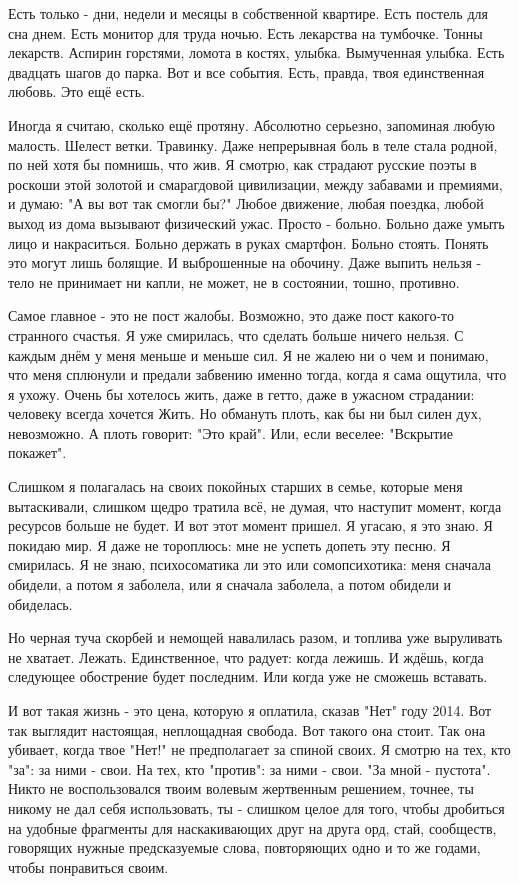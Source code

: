 Есть только - дни, недели и месяцы в собственной квартире. Есть постель для сна
днем. Есть монитор для труда ночью. Есть лекарства на тумбочке. Тонны лекарств.
Аспирин горстями, ломота в костях, улыбка. Вымученная улыбка. Есть двадцать
шагов до парка. Вот и все события. Есть, правда, твоя единственная любовь. Это
ещё есть. 

Иногда я считаю, сколько ещё протяну. Абсолютно серьезно, запоминая любую
малость. Шелест ветки. Травинку. Даже непрерывная боль в теле стала родной, по
ней хотя бы помнишь, что жив. Я смотрю, как страдают русские поэты в роскоши
этой золотой и смарагдовой цивилизации, между забавами и премиями, и думаю: "А
вы вот так смогли бы?" Любое движение, любая поездка, любой выход из дома
вызывают физический ужас. Просто - больно. Больно даже умыть лицо и
накраситься. Больно держать в руках смартфон. Больно стоять. Понять это могут
лишь болящие. И выброшенные на обочину. Даже выпить нельзя - тело не принимает
ни капли, не может, не в состоянии, тошно, противно.

Самое главное - это не пост жалобы. Возможно, это даже пост какого-то странного
счастья. Я уже смирилась, что сделать больше ничего нельзя. С каждым днём у
меня меньше и меньше сил. Я не жалею ни о чем и понимаю, что меня сплюнули и
предали забвению именно тогда, когда я сама ощутила, что я ухожу. Очень бы
хотелось жить, даже в гетто, даже в ужасном страдании: человеку всегда хочется
Жить. Но обмануть плоть, как бы ни был силен дух, невозможно. А плоть говорит:
"Это край". Или, если веселее: "Вскрытие покажет". 

Слишком я полагалась на своих покойных старших в семье, которые меня
вытаскивали, слишком щедро тратила всё, не думая, что наступит момент, когда
ресурсов больше не будет. И вот этот момент пришел. Я угасаю, я это знаю. Я
покидаю мир. Я даже не тороплюсь: мне не успеть допеть эту песню. Я смирилась.
Я не знаю, психосоматика ли это или сомопсихотика: меня сначала обидели, а
потом я заболела, или я сначала заболела, а потом обидели и обиделась. 

Но черная туча скорбей и немощей навалилась разом, и топлива уже выруливать не
хватает. Лежать. Единственное, что радует: когда лежишь. И ждёшь, когда
следующее обострение будет последним. Или когда уже не сможешь вставать. 

И вот такая жизнь - это цена, которую я оплатила, сказав "Нет" году 2014. Вот
так выглядит настоящая, неплощадная свобода. Вот такого она стоит. Так она
убивает, когда твое "Нет!" не предполагает за спиной своих. Я смотрю на тех,
кто "за": за ними - свои. На тех, кто "против": за ними - свои. "За мной -
пустота". Никто не воспользовался твоим волевым жертвенным решением, точнее, ты
никому не дал себя использовать, ты - слишком целое для того, чтобы дробиться
на удобные фрагменты для наскакивающих друг на друга орд, стай, сообществ,
говорящих нужные предсказуемые слова, повторяющих одно и то же годами, чтобы
понравиться своим.

